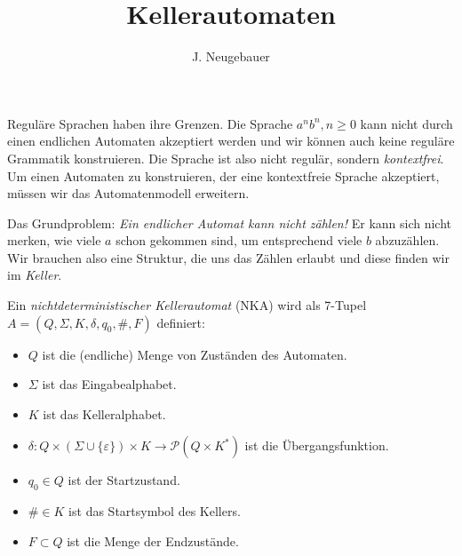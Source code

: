 \documentclass[10pt, a4paper]{scrartcl}
\author{J. Neugebauer}
\title{Kellerautomaten}
\date{\Heute}
\begin{document}
\ReiheTitel

Reguläre Sprachen haben ihre Grenzen. Die Sprache $a^nb^n, n\geq 0$ kann nicht durch einen endlichen Automaten akzeptiert werden und wir können auch keine reguläre Grammatik konstruieren. Die Sprache ist also nicht regulär, sondern \emph{kontextfrei}. Um einen Automaten zu konstruieren, der eine kontextfreie Sprache akzeptiert, müssen wir das Automatenmodell erweitern. 

Das Grundproblem: \emph{Ein endlicher Automat kann nicht zählen!} Er kann sich nicht merken, wie viele $a$ schon gekommen sind, um entsprechend viele $b$ abzuzählen. Wir brauchen also eine Struktur, die uns das Zählen erlaubt und diese finden wir im \emph{Keller}.

\begin{infobox}
Ein \emph{nichtdeterministischer Kellerautomat} (NKA) wird als 7-Tupel $A = (Q, \Sigma, K, \delta, q_0, \#, F)$ definiert:
\begin{itemize}
	\item $Q$ ist die (endliche) Menge von Zuständen des Automaten.
	\item $\Sigma$ ist das Eingabealphabet.
	\item $K$ ist das Kelleralphabet.
	\item $\delta: Q\times (\Sigma\cup \{\varepsilon\}) \times K\rightarrow \mathcal P(Q \times K^{*})$ ist die Übergangsfunktion.
	\item $q_0\in Q$ ist der Startzustand.
	\item $\#\in K$ ist das Startsymbol des Kellers.
	\item $F\subset Q$ ist die Menge der Endzustände.
\end{itemize}
\end{infobox}
\end{document}
